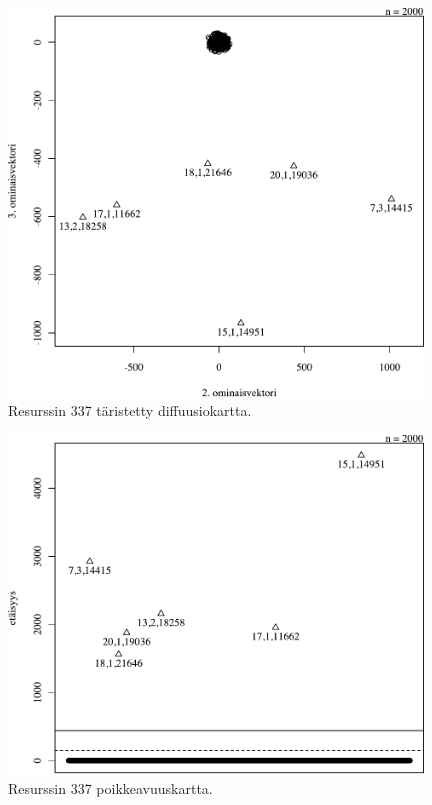 \begin{figure}[p]
\centering
\includegraphics[width=11cm]{pics/diffuusiokuvat/service_337.pdf}
\caption{Resurssin 337 täristetty diffuusiokartta.}
\label{diffuusio_337}
\end{figure}

\begin{figure}[p]
\centering
\includegraphics[width=11cm]{pics/tiheyskuvat/service_337.pdf}
\caption{Resurssin 337 poikkeavuuskartta.}
\label{service_337}
\end{figure}

